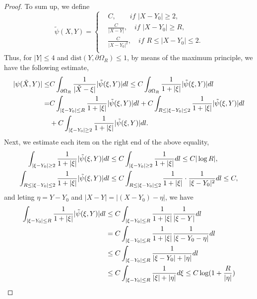 \documentclass[10pt,a4paper]{amsart}
\begin{document}
\begin{proof}
To sum up,  we define
\begin{equation}\nonumber
\tilde{\psi}(X,Y)=\left\{\begin{aligned}
 &C, \qquad  if\,\, |X-Y_{0}|\geq 2, \\
&\frac{C}{|X-Y|}, \quad  if\,\, |X-Y_{0}|\geq R,\\
&\frac{C}{|X-Y_{0}|^{2}}, \quad  if\,\, R\leq|X-Y_{0}|\leq 2.\\
\end{aligned}  \right.
\end{equation}
Thus, for $|Y|\leq 4$ and $\text{dist}(Y,\partial\Omega_{R})\leq 1$, by means of the maximum principle, we have the following estimate, 
\begin{align}
|\psi(\tilde{X},Y)|\leq & C\int_{\partial\Omega_{R}}\frac{1}{|\tilde{X}-\xi|}|\tilde{\psi}(\xi,Y)|{\rm d}l
\leq C\int_{\partial\Omega_{R}}\frac{1}{1+|\xi|}|\tilde{\psi}(\xi,Y)|{\rm d}l\nonumber\\
=& C\int_{|\xi-Y_{0}|\leq R}\frac{1}{1+|\xi|}|\tilde{\psi}(\xi,Y)|{\rm d}l
+C\int_{R\leq|\xi-Y_{0}|\leq 2}\frac{1}{1+|\xi|}|\tilde{\psi}(\xi,Y)|{\rm d}l\nonumber\\
&+C\int_{|\xi-Y_{0}|\geq 2}\frac{1}{1+|\xi|}|\tilde{\psi}(\xi,Y)|{\rm d}l.\nonumber
\end{align}
Next, we estimate each item on the right end of the above equality,
\begin{align}
\int_{|\xi-Y_{0}|\geq 2}\frac{1}{1+|\xi|}|\tilde{\psi}(\xi,Y)|{\rm d}l&\leq C \int_{|\xi-Y_{0}|\geq 2}\frac{1}{1+|\xi|}{\rm d}l
\leq C |\log R|,\nonumber\\
\int_{R\leq|\xi-Y_{0}|\leq 2}\frac{1}{1+|\xi|}|\tilde{\psi}(\xi,Y)|{\rm d}l&\leq C \int_{R\leq|\xi-Y_{0}|\leq 2}\frac{1}{1+|\xi|}\cdot\frac{1}{|\xi-Y_{0}|^{2}}{\rm d}l
\leq C ,\nonumber
\end{align}
and leting $\eta=Y-Y_{0}$ and $|X-Y|=|(X-Y_{0})-\eta|$,   we have
\begin{align}
\int_{|\xi-Y_{0}|\leq R}\frac{1}{1+|\xi|}|\tilde{\psi}(\xi,Y)|{\rm d}l&\leq C \int_{|\xi-Y_{0}|\leq R}\frac{1}{1+|\xi|}\frac{1}{|\xi-Y|}{\rm d}l\nonumber\\
&=C\int_{|\xi-Y_{0}|\leq R}\frac{1}{1+|\xi|}\frac{1}{|\xi-Y_{0}-\eta|}{\rm d}l\nonumber\\
&\leq  C \int_{|\xi-Y_{0}|\leq R}\frac{1}{|\xi-Y_{0}|+|\eta|}{\rm d}l\nonumber\\
&\leq  C \int_{|\xi-Y_{0}|\leq R}\frac{1}{|\xi|+|\eta|}{\rm d}\xi
\leq C\log (1+\frac{R}{|\eta|})\nonumber\\

\end{align}
\end{proof}
\end{document}
